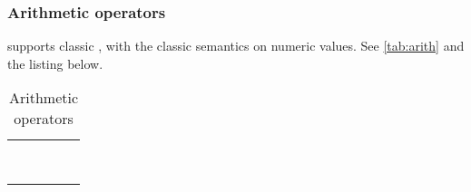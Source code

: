 \subsubsection{Arithmetic operators}

\us supports classic , with the classic semantics
on numeric values. See \autoref{tab:arith} and the listing below.

\newcommand{\whetherHtml}[2]{%
  \ifx\ifHtml\undefined%
    #2%
  \else%
    #1%
  \fi%
}

\newenvironment{operatorTabular}
{
  \begin{tabular}{|*{5}{c|}}
    \hline
    \strong{\whetherHtml{Operator}{Oper.}}
    & \strong{Syntax}
    & \strong{\whetherHtml{Associativity}{Assoc.}}
    & \strong{Semantics}
    & \strong{Equivalence}
    \\
    \hline
  }{%
    \\
    \hline
  \end{tabular}
}

\newenvironment{operatorTable}[3][]
{
  \def\operatorTableLabel{#2}%
  \def\operatorTableCaption{#3}%
  \begin{table}[\floatposh]
    \centering#1%
    \begin{operatorTabular}
    }{%
    \end{operatorTabular}
    \caption{\operatorTableCaption}
    \label{\operatorTableLabel}
  \end{table}
}

\begin{operatorTable}{tab:arith}{Arithmetic operators}
  \operatoruplus\\
  \operatorumin
  \\\hline
  \operatorexp
  \\\hline
  \operatormult\\
  \operatordiv\\
  \operatormod
  \\\hline
  \operatorplus\\
  \operatorminus
\end{operatorTable}

